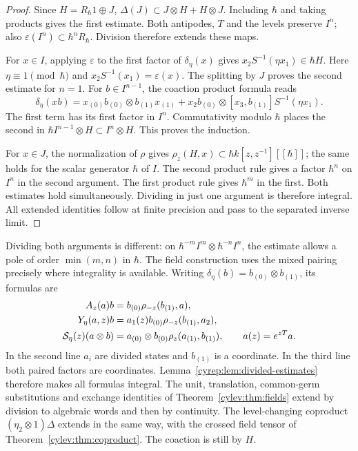 \begin{proof}
Since \(H=R_\hbar1\oplus J\),
\(\Delta(J)\subset J\otimes H+H\otimes J\).
Including \(\hbar\) and taking products gives the first estimate.
Both antipodes, \(T\) and the levels preserve \(I^n\);
also \(\varepsilon(I^n)\subset\hbar^nR_\hbar\).
Division therefore extends these maps.

For \(x\in I\), applying \(\varepsilon\) to the first factor of
\(\delta_\eta(x)\) gives \(x_2S^{-1}(\eta x_1)\in\hbar H\).
Here \(\eta\equiv1\pmod\hbar\) and
\(x_2S^{-1}(x_1)=\varepsilon(x)\).
The splitting by \(J\) proves the second estimate for \(n=1\).
For \(b\in I^{n-1}\), the coaction product formula reads
\[
 \delta_\eta(xb)=
 x_{(0)}b_{(0)}\otimes b_{(1)}x_{(1)}
 +x_2b_{(0)}\otimes[x_3,b_{(1)}]S^{-1}(\eta x_1).
\]
The first term has its first factor in \(I^n\).
Commutativity modulo \(\hbar\) places the second in
\(\hbar I^{n-1}\otimes H\subset I^n\otimes H\).
This proves the induction.

For \(x\in J\), the normalization of \(\rho\) gives
\(\rho_z(H,x)\subset\hbar k[z,z^{-1}][[\hbar]]\);
the same holds for the scalar generator \(\hbar\) of \(I\).
The second product rule gives a factor \(\hbar^n\) on \(I^n\)
in the second argument. The first product rule gives
\(\hbar^m\) in the first. Both estimates hold simultaneously.
Dividing in just one argument is therefore integral.
All extended identities follow at finite precision and pass
to the separated inverse limit.
\end{proof}

Dividing both arguments is different: on
\(\hbar^{-m}I^m\otimes\hbar^{-n}I^n\), the estimate allows
a pole of order \(\min(m,n)\) in \(\hbar\).
The field construction uses the mixed pairing precisely where
integrality is available.
Writing
\(\delta_\eta(b)=b_{(0)}\otimes b_{(1)}\), its formulas are
\begin{align}
 A_z(a)b&=b_{(0)}\rho_{-z}(b_{(1)},a),\notag\\
 Y_\eta(a,z)b&=a_1(z)b_{(0)}
                         \rho_{-z}(b_{(1)},a_2),\notag\\
 \mathcal S_\eta(z)(a\otimes b)
   &=a_{(0)}\otimes b_{(0)}
                         \rho_z(a_{(1)},b_{(1)}),
 \qquad a(z)=e^{zT}a.
 \label{cyrep:eq:divided-fields}
\end{align}
In the second line \(a_i\) are divided states and \(b_{(1)}\)
is a coordinate. In the third line both paired factors are
coordinates. Lemma~\ref{cyrep:lem:divided-estimates} therefore
makes all formulas integral.
The unit, translation, common-germ substitutions and exchange
identities of Theorem~\ref{cylev:thm:fields} extend by division
to algebraic words and then by continuity.
The level-changing coproduct
\((\eta_2\otimes1)\Delta\) extends in the same way, with the
crossed field tensor of Theorem~\ref{cylev:thm:coproduct}.
The coaction is still by \(H\).


